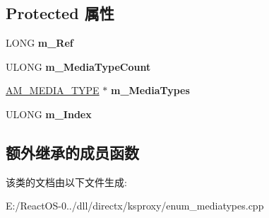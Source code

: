 \subsection*{Protected 属性}
\begin{DoxyCompactItemize}
\item 
\mbox{\label{class_c_enum_media_types_a384059f5c12453700e04c2c8c82dfdda}} 
L\+O\+NG {\bfseries m\+\_\+\+Ref}
\item 
\mbox{\label{class_c_enum_media_types_a027cb8475ee634a509bd47ba3087f88c}} 
U\+L\+O\+NG {\bfseries m\+\_\+\+Media\+Type\+Count}
\item 
\mbox{\label{class_c_enum_media_types_a5bbe3d0879ab491f428ab0c22b253ceb}} 
\hyperlink{struct_a_m___m_e_d_i_a___t_y_p_e}{A\+M\+\_\+\+M\+E\+D\+I\+A\+\_\+\+T\+Y\+PE} $\ast$ {\bfseries m\+\_\+\+Media\+Types}
\item 
\mbox{\label{class_c_enum_media_types_a7f47e4db672959281e038d3626873c8e}} 
U\+L\+O\+NG {\bfseries m\+\_\+\+Index}
\end{DoxyCompactItemize}
\subsection*{额外继承的成员函数}


该类的文档由以下文件生成\+:\begin{DoxyCompactItemize}
\item 
E\+:/\+React\+O\+S-\/0../dll/directx/ksproxy/enum\+\_\+mediatypes.\+cpp\end{DoxyCompactItemize}

